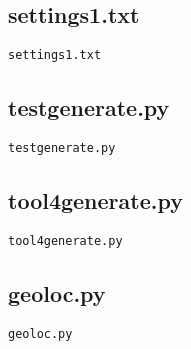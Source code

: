 \documentclass[a4paper, 10pt]{report}
\def\ttr{\tt\color{red}}
\begin{document}
\subsection{settings1.txt}
\label{settings1}
{\ttr \Large settings1.txt}
{\small}

\newpage
\subsection{testgenerate.py}
\label{testgenerate}
{\ttr \Large testgenerate.py}
{\small}


\subsection{tool4generate.py}
\label{tool4generate}
{\ttr \Large tool4generate.py}
{\small}

\newpage
\subsection{geoloc.py}
{\ttr \Large geoloc.py}
{\small}
\end{document}
